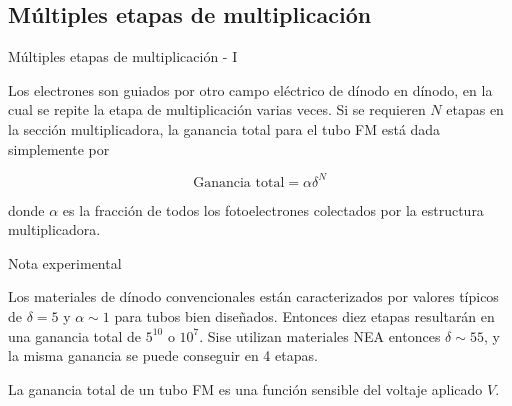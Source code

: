 \documentclass[a4paper,10pt]{beamer}
\begin{document}
\subsection{Múltiples etapas de multiplicación}
\begin{frame}{Múltiples etapas de multiplicación - I}
 \begin{justify}
 Los electrones son guiados por otro campo eléctrico de dínodo en dínodo, en
 la cual se repite la etapa  de multiplicación varias veces. Si se requieren 
 $N$ etapas en la sección multiplicadora, la ganancia total para el tubo FM
 está dada simplemente por 
 
 \begin{equation}
  \text{Ganancia total} = \alpha \delta^N
 \end{equation}
 
 donde $\alpha$ es la fracción de todos los fotoelectrones colectados por la 
 estructura multiplicadora.
\end{justify}
 
 \begin{exampleblock}{Nota experimental}
 \begin{itemize}
 \begin{footnotesize}
\item \begin{justify}
  Los materiales de dínodo convencionales están caracterizados por valores típicos 
  de $\delta=5$ y $\alpha \sim 1$ para tubos bien diseñados. Entonces diez etapas
  resultarán en una ganancia total de $5^10$ o $10^7$. Sise utilizan materiales 
  NEA entonces $\delta \sim 55$, y la misma ganancia se puede conseguir en 4 etapas.
 \end{justify}
\item \begin{justify}
       La ganancia total de un tubo FM es una función sensible del voltaje aplicado $V$.
      \end{justify}
 \end{footnotesize}
 \end{itemize} 
 \end{exampleblock}

 
\end{frame}
\end{document}
